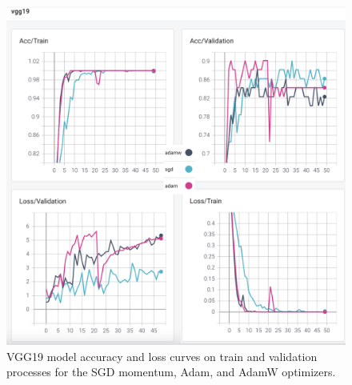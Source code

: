 \begin{figure}[!h]
    \centering
    \includegraphics[width=\linewidth]{fig/vgg19.png}
    \vspace{2mm}
    \caption{VGG19 model accuracy and loss curves on train and validation processes for the SGD momentum, Adam, and AdamW optimizers.}
    \label{fig:vgg19_plots}
\end{figure}


